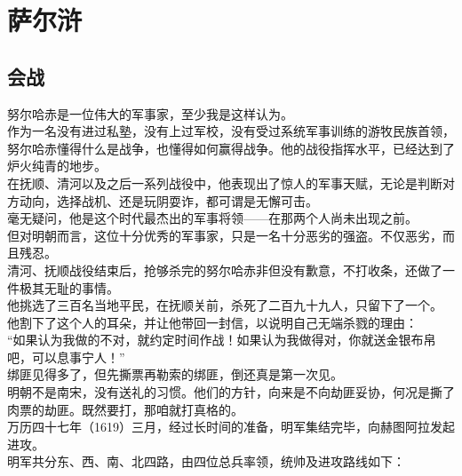 \section{萨尔浒}
\ifnum{}
	\begin{multicols}{\theparacolNo}
\fi
\subsection{会战}
努尔哈赤是一位伟大的军事家，至少我是这样认为。\\

作为一名没有进过私塾，没有上过军校，没有受过系统军事训练的游牧民族首领，努尔哈赤懂得什么是战争，也懂得如何赢得战争。他的战役指挥水平，已经达到了炉火纯青的地步。\\

在抚顺、清河以及之后一系列战役中，他表现出了惊人的军事天赋，无论是判断对方动向，选择战机、还是玩阴耍诈，都可谓是无懈可击。\\

毫无疑问，他是这个时代最杰出的军事将领——在那两个人尚未出现之前。\\

但对明朝而言，这位十分优秀的军事家，只是一名十分恶劣的强盗。不仅恶劣，而且残忍。\\

清河、抚顺战役结束后，抢够杀完的努尔哈赤非但没有歉意，不打收条，还做了一件极其无耻的事情。\\

他挑选了三百名当地平民，在抚顺关前，杀死了二百九十九人，只留下了一个。\\

他割下了这个人的耳朵，并让他带回一封信，以说明自己无端杀戮的理由：\\

“如果认为我做的不对，就约定时间作战！如果认为我做得对，你就送金银布帛吧，可以息事宁人！”\\

绑匪见得多了，但先撕票再勒索的绑匪，倒还真是第一次见。\\

明朝不是南宋，没有送礼的习惯。他们的方针，向来是不向劫匪妥协，何况是撕了肉票的劫匪。既然要打，那咱就打真格的。\\

万历四十七年（1619）三月，经过长时间的准备，明军集结完毕，向赫图阿拉发起进攻。\\

明军共分东、西、南、北四路，由四位总兵率领，统帅及进攻路线如下：\\


\end{multicols}
